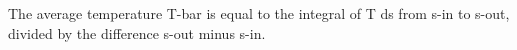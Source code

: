 The average temperature T-bar is equal to the integral of T ds from s-in to s-out, divided by the difference s-out minus s-in.